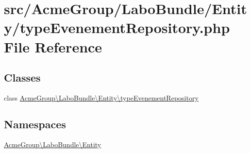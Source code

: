 \hypertarget{type_evenement_repository_8php}{\section{src/\+Acme\+Group/\+Labo\+Bundle/\+Entity/type\+Evenement\+Repository.php File Reference}
\label{type_evenement_repository_8php}
}
\subsection*{Classes}
\begin{DoxyCompactItemize}
\item 
class \hyperlink{class_acme_group_1_1_labo_bundle_1_1_entity_1_1type_evenement_repository}{Acme\+Group\textbackslash{}\+Labo\+Bundle\textbackslash{}\+Entity\textbackslash{}type\+Evenement\+Repository}
\end{DoxyCompactItemize}
\subsection*{Namespaces}
\begin{DoxyCompactItemize}
\item 
 \hyperlink{namespace_acme_group_1_1_labo_bundle_1_1_entity}{Acme\+Group\textbackslash{}\+Labo\+Bundle\textbackslash{}\+Entity}
\end{DoxyCompactItemize}
